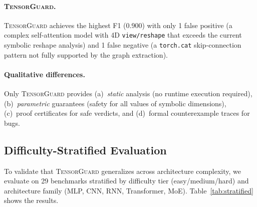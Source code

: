 \documentclass[11pt]{article}
\begin{document}
\paragraph{\textsc{TensorGuard}.}
\textsc{TensorGuard} achieves the highest F1 (0.900) with only 1 false
positive (a complex self-attention model with 4D \texttt{view/reshape}
that exceeds the current symbolic reshape analysis) and 1 false
negative (a \texttt{torch.cat} skip-connection pattern not fully
supported by the graph extraction).

\paragraph{Qualitative differences.}
Only \textsc{TensorGuard} provides (a)~\emph{static} analysis
(no runtime execution required), (b)~\emph{parametric} guarantees
(safety for all values of symbolic dimensions), (c)~proof certificates
for safe verdicts, and (d)~formal counterexample traces for bugs.

\subsection{Difficulty-Stratified Evaluation}\label{sec:stratified}

To validate that \textsc{TensorGuard} generalizes across architecture
complexity, we evaluate on 29 benchmarks stratified by difficulty tier
(easy/medium/hard) and architecture family
(MLP, CNN, RNN, Transformer, MoE).
Table~\ref{tab:stratified} shows the results.
\end{document}
